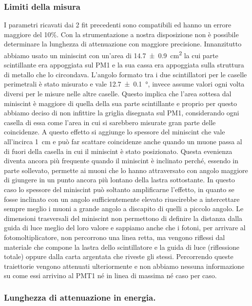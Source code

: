 \subsubsection{Limiti della misura}

I parametri ricavati dai 2 fit precedenti sono compatibili ed hanno un errore maggiore del 10\%. Con la strumentazione a nostra disposizione non è possibile determinare la lunghezza di attenuazione con maggiore precisione. Innanzitutto abbiamo usato un miniscint con un'area di \SI{14.7\pm0.9}{cm^2} la cui parte scintillante era appoggiata sul PM1 e la sua cassa  era appoggiata sulla struttura di metallo che lo circondava. L'angolo formato tra i due scintillatori per le caselle perimetrali è stato misurato e vale \SI{12.7\pm0.1}{\degree}, invece assume valori ogni volta diversi per le misure nelle altre caselle. Questo implica che l'area sottesa dal miniscint è maggiore di quella della sua parte scintillante e proprio per questo abbiamo deciso di non infittire la griglia disegnata sul PM1, considerando ogni casella di essa come l'area in cui si sarebbero misurate gran parte delle coincidenze. A questo effetto si aggiunge lo spessore del miniscint che vale all'incirca \SI{1}{cm} e può far scattare coincidenze anche quando un muone passa al di fuori della casella in cui il miniscint è stato posizionato. Questa evenienza diventa ancora più frequente quando il miniscint è inclinato perché, essendo in parte sollevato, permette ai muoni che lo hanno attraversato con angolo maggiore di giungere in un punto ancora più lontano della lastra sottostante. In questo caso lo spessore del miniscint può soltanto amplificarne l'effetto, in quanto se fosse inclinato con un angolo sufficientemente elevato riuscirebbe a intercettare sempre meglio  i muoni a grande angolo a discapito di quelli a piccolo angolo.
Le dimensioni trasversali del miniscint non permettono di definire la distanza dalla guida di luce meglio del loro valore e sappiamo anche che i fotoni, per arrivare al fotomoltiplicatore,  non percorrono una linea retta, ma vengono riflessi dal materiale che compone la lastra dello scintillatore e la guida di luce (riflessione totale) oppure dalla carta argentata che riveste gli stessi. Percorrendo queste traiettorie vengono attenuati ulteriormente e non abbiamo nessuna informazione su come essi arrivino al PMT1 né in linea di massima né caso per caso.

\subsubsection{Lunghezza di attenuazione in energia.}

